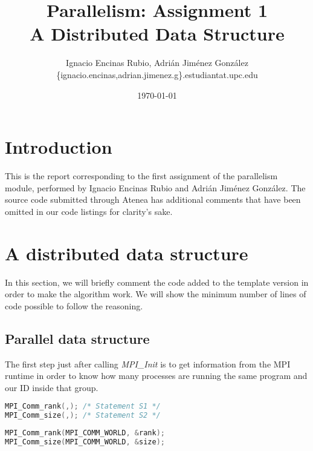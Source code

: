 \documentclass[a4paper, 10pt]{article}
\title{\textbf{Parallelism: Assignment 1\\A Distributed Data Structure}}
\author{Ignacio Encinas Rubio, Adrián Jiménez González\\\{ignacio.encinas,adrian.jimenez.g\}.estudiantat.upc.edu}
\date{\normalsize\today{}}
\begin{document}
\maketitle

  
  

\section{Introduction}

This is the report corresponding to the first assignment of the parallelism module, performed by Ignacio Encinas Rubio and Adrián Jiménez González. The source code submitted through Atenea has additional comments that have been omitted in our code listings for clarity's sake.


\section{A distributed data structure}

   In this section, we will briefly comment the code added to the template version in order to
   make the algorithm work. We will show the minimum number of lines of code possible to follow the reasoning.

\subsection{Parallel data structure}


    The first step just after calling \textit{MPI\_Init} is to get information from the MPI runtime in order to know how many processes are running the same program and our ID inside that group. 

    \begin{minipage}{.45\textwidth}
	\begin{lstlisting}[language=c, caption={Template S1, S2}]
MPI_Comm_rank(,); /* Statement S1 */
MPI_Comm_size(,); /* Statement S2 */
	\end{lstlisting}
    \end{minipage}\hfill
    \begin{minipage}{.45\textwidth}
	\begin{lstlisting}[language=c, caption={Correct S1, S2}]
MPI_Comm_rank(MPI_COMM_WORLD, &rank); 
MPI_Comm_size(MPI_COMM_WORLD, &size); 
	\end{lstlisting}
    \end{minipage}
\end{document}
